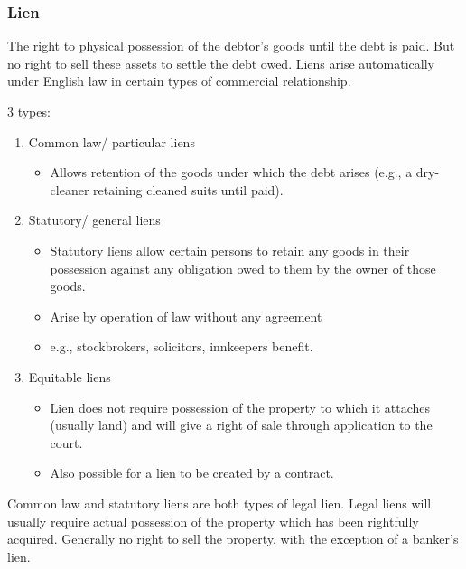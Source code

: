 \documentclass[
]{article}
\providecommand{\tightlist}{%
  \setlength{\itemsep}{0pt}\setlength{\parskip}{0pt}}
\begin{document}
\hypertarget{lien}{%
\subsubsection{Lien}\label{lien}}

The right to physical possession of the debtor's goods until the debt is
paid. But no right to sell these assets to settle the debt owed. Liens
arise automatically under English law in certain types of commercial
relationship.

3 types:

\begin{enumerate}
\tightlist
\item
  Common law/ particular liens

  \begin{itemize}
  \tightlist
  \item
    Allows retention of the goods under which the debt arises (e.g., a
    dry-cleaner retaining cleaned suits until paid).
  \end{itemize}
\item
  Statutory/ general liens

  \begin{itemize}
  \tightlist
  \item
    Statutory liens allow certain persons to retain any goods in their
    possession against any obligation owed to them by the owner of those
    goods.
  \item
    Arise by operation of law without any agreement
  \item
    e.g., stockbrokers, solicitors, innkeepers benefit.
  \end{itemize}
\item
  Equitable liens

  \begin{itemize}
  \tightlist
  \item
    Lien does not require possession of the property to which it
    attaches (usually land) and will give a right of sale through
    application to the court.
  \item
    Also possible for a lien to be created by a contract.
  \end{itemize}
\end{enumerate}

Common law and statutory liens are both types of legal lien. Legal liens
will usually require actual possession of the property which has been
rightfully acquired. Generally no right to sell the property, with the
exception of a banker's lien.
\end{document}
